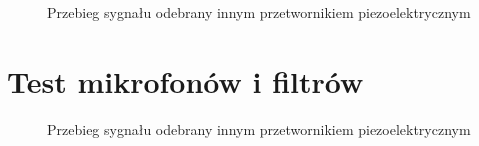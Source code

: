 \begin{figure}[!ht]
    \centering
    \caption{Przebieg sygnału odebrany innym przetwornikiem piezoelektrycznym}
    \label{fig:oscylo_piezo}
\end{figure}

\section{Test mikrofonów i filtrów}


\begin{figure}[!ht]
    \centering
    \caption{Przebieg sygnału odebrany innym przetwornikiem piezoelektrycznym}
    \label{fig:oscylo_piezo}
\end{figure}

